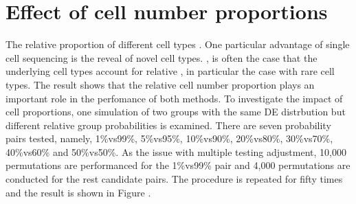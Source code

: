 \section{Effect of cell number proportions}
The relative proportion of different cell types . One particular advantage of single cell sequencing is the reveal of novel cell types. ,  is often the case that the underlying cell types account for relative , in particular the case with rare cell types. 
The result shows that the relative cell number proportion plays an important role in the perfomance of both methods. 
To investigate the impact of cell proportions, one simulation of two groups with the same DE distrbution but different relative group probabilities is examined. There are seven probability pairs tested, namely, 1\%vs99\%, 5\%vs95\%, 10\%vs90\%, 20\%vs80\%, 30\%vs70\%, 40\%vs60\% and 50\%vs50\%. As the issue with multiple testing adjustment, 10,000 permutations are performanced for the 1\%vs99\% pair and 4,000 permutations are conducted for the rest candidate pairs.  The procedure is repeated for fifty times and the result is shown in Figure . 
\subsection{}
